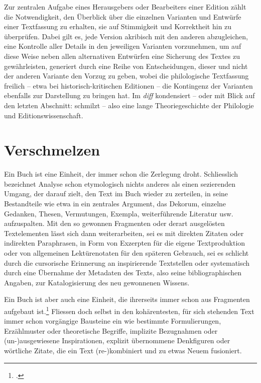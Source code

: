 \documentclass[a4paper,10pt]{article}
\begin{document}
Zur zentralen Aufgabe eines Herausgebers oder Bearbeiters einer Edition zählt die Notwendigkeit, den Überblick über die einzelnen Varianten und Entwürfe einer Textfassung zu erhalten, sie auf Stimmigkeit und Korrektheit hin zu überprüfen. Dabei gilt es, jede Version akribisch mit den anderen abzugleichen, eine Kontrolle aller Details in den jeweiligen Varianten vorzunehmen, um auf diese Weise neben allen alternativen Entwürfen eine Sicherung des Textes zu gewährleisten, generiert durch eine Reihe von Entscheidungen, dieser und nicht der anderen Variante den Vorzug zu geben, wobei die philologische Textfassung freilich – etwa bei historisch-kritischen Editionen – die Kontingenz der Varianten ebenfalls zur Darstellung zu bringen hat. Im \emph{diff} kondensiert – oder mit Blick auf den letzten Abschnitt: schmilzt – also eine lange Theoriegeschichte der Philologie und Editionswissenschaft.


\section{Verschmelzen}

Ein Buch ist eine Einheit, der immer schon die Zerlegung droht. Schliesslich bezeichnet Analyse schon etymologisch nichts anderes als einen sezierenden Umgang, der darauf zielt, den Text im Buch wieder zu zerteilen, in seine Bestandteile wie etwa in ein zentrales Argument, das Dekorum, einzelne Gedanken, Thesen, Vermutungen, Exempla, weiterführende Literatur usw. aufzuspalten. %
Mit den so gewonnen Fragmenten oder derart ausgelösten Textelementen lässt sich dann weiterarbeiten, sei es mit direkten Zitaten oder indirekten Paraphrasen, in Form von Exzerpten für die eigene Textproduktion oder von allgemeinen Lektürenotaten für den späteren Gebrauch, sei es schlicht durch die cursorische Erinnerung an inspirierende Textstellen oder systematisch durch eine Übernahme der Metadaten des Texts, also seine bibliographischen Angaben, zur Katalogisierung des neu gewonnenen Wissens. 
 
Ein Buch ist aber auch eine Einheit, die ihrerseits immer schon aus Fragmenten aufgebaut ist.\footcite[Zur Übersicht einer historischen Genese des Fragments als ästhetische Produktivkraft vgl.][]{fetscher:2001} Fliessen doch selbst in den kohärentesten, für sich stehenden Text immer schon vorgängige Bausteine ein wie bestimmte Formulierungen, Erzählmuster oder theoretische Begriffe, implizite Bezugnahmen oder (un-)ausgewiesene Inspirationen, explizit übernommene Denkfiguren oder wörtliche Zitate, die ein Text (re-)kombiniert und zu etwas Neuem fusioniert. 
 
\end{document}
